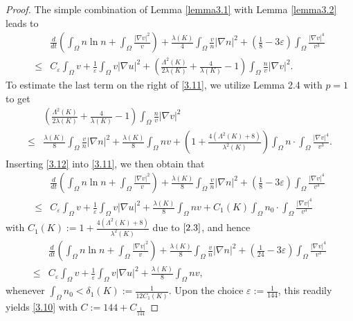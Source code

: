 \documentclass[12pt]{article}
\theoremstyle{plain}
\theoremstyle{definition}
\numberwithin{equation}{section}
\begin{document}
\begin{proof}[Proof]
 The simple combination of Lemma \ref{lemma3.1} with  Lemma \ref{lemma3.2} leads to
\begin{equation}\label{3.11}
\begin{split}
&\frac d{dt} (\int_\Omega n\ln n+\int_\Omega  \frac{|\nabla v|^2}v)+
\frac{\lambda(K)} 4\int_\Omega\frac{v}{n}|\nabla n|^2+
(\frac18-3\varepsilon)
\int_\Omega \frac{|\nabla v|^4}{v^3}
\\
\leq &
C_\varepsilon\int_{\Omega}v+  \frac 1{\varepsilon}\int_\Omega v |\nabla u|^2
+(\frac{\Lambda^2(K)}{2\lambda(K)}+\frac 4{\lambda(K)}-1) \int_\Omega \frac nv |\nabla v|^2.
\end{split}
\end{equation}
To estimate the last term on the right of \eqref{3.11}, we utilize Lemma 2.4 with $p=1$ to get
\begin{equation}\label{3.12}
\begin{split}
&(\frac{\Lambda^2(K)}{2\lambda(K)}+\frac 4{\lambda(K)}-1) \int_\Omega \frac nv |\nabla v|^2\\
\leq & \frac{\lambda(K)}8 \int_\Omega\frac{v}{n}|\nabla n|^2
+\frac{\lambda(K)}8\int_\Omega nv+
(1+\frac {4(\Lambda^2(K)+8)}{\lambda^2(K)})
\int_\Omega n \cdot
\int_\Omega \frac{|\nabla v|^4}{v^3}.
\end{split}
\end{equation}
Inserting \eqref{3.12} into \eqref{3.11}, we then obtain  that
\begin{equation}\label{3.13}
\begin{split}
&\frac d{dt} (\int_\Omega n\ln n+\int_\Omega  \frac{|\nabla v|^2}v)+
\frac{\lambda(K)} 8\int_\Omega\frac{v}{n}|\nabla n|^2+
(\frac18-3\varepsilon)
\int_\Omega \frac{|\nabla v|^4}{v^3}
\\
\leq &
C_\varepsilon\int_{\Omega}v+  \frac 1{\varepsilon}\int_\Omega v |\nabla u|^2
+\frac{\lambda(K)}8\int_\Omega nv+
C_1(K) \int_\Omega n_0 \cdot
\int_\Omega \frac{|\nabla v|^4}{v^3}
\end{split}
\end{equation}
with $C_1(K):=1+\frac {4(\Lambda^2(K)+8)}{\lambda^2(K)}$  due to $\eqref{2.3}$, and hence
\begin{equation*}
\begin{split}
&\frac d{dt} (\int_\Omega n\ln n+\int_\Omega  \frac{|\nabla v|^2}v)+
\frac{\lambda(K)} 8\int_\Omega\frac{v}{n}|\nabla n|^2+
(\frac1 {24}-3\varepsilon)
\int_\Omega \frac{|\nabla v|^4}{v^3}
\\
\leq &
C_\varepsilon\int_{\Omega}v+  \frac 1{\varepsilon}\int_\Omega v |\nabla u|^2
+\frac{\lambda(K)}8\int_\Omega nv,
\end{split}
\end{equation*}
whenever  $\int_\Omega n_0 < \delta_1(K):=\frac1{12C_1(K)}$. Upon the choice $\varepsilon:=\frac1{144}$, this readily yields \eqref{3.10} with
$C:=144+C_{\frac1{144}}$
\end{proof}
\end{document}
